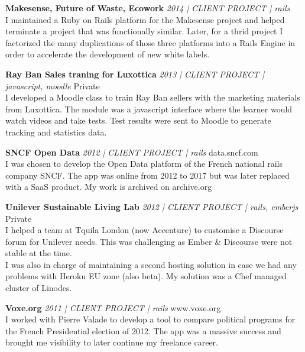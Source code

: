 \documentclass[a4paper]{article}
\begin{document}
{\textbf{Makesense, Future of Waste, Ecowork} \sl 2014 | CLIENT PROJECT | rails} \hfill\\
I maintained a Ruby on Rails platform for the Makesense project and helped terminate a project that was functionally similar.
Later, for a thrid project I factorized the many duplications of those three platforms into a Rails Engine in order
to accelerate the development of new white labels.
\vspace*{2mm}

{\textbf{Ray Ban Sales traning for Luxottica} \sl 2013 | CLIENT PROJECT | javascript, moodle} \hfill Private\\
I developed a Moodle class to train Ray Ban sellers with the marketing materials from Luxottica.
The module was a javascript interface where the learner would watch videos and take tests.
Test results were sent to Moodle to generate tracking and statistics data.\\
\vspace*{2mm}

{\textbf{SNCF Open Data} \sl 2012 | CLIENT PROJECT | rails} \hfill data.sncf.com\\
I was chosen to develop the Open Data platform of the French national rails company SNCF.
The app was online from 2012 to 2017 but was later replaced with a SaaS product.
My work is archived on archive.org\\
\vspace*{2mm}

{\textbf{Unilever Sustainable Living Lab} \sl 2012 | CLIENT PROJECT | rails, emberjs} \hfill Private\\
I helped a team at Tquila London (now Accenture) to customise a Discourse forum for Unilever needs.
This was challenging as Ember \& Discourse were not stable at the time. \\
I was also in charge of maintaining a second hosting solution in case we had any problems with Heroku EU zone (also beta).
My solution was a Chef managed cluster of Linodes.\\

\pagebreak

{\textbf{Voxe.org} \sl 2011 | CLIENT PROJECT | rails} \hfill www.voxe.org\\
I worked with Pierre Valade to develop a tool to compare political programs for the French Presidential election of 2012.
The app was a massive success and brought me visibility to later continue my freelance career.\\
\vspace*{2mm}
\end{document}
